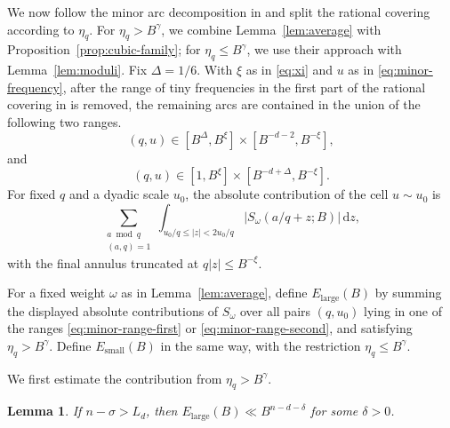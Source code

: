 \documentclass[reqno,a4paper,11pt]{amsart}
\numberwithin{equation}{section}
\newcommand{\dint}{\,\mathrm d}
\theoremstyle{plain}
\newtheorem{lemma}[theorem]{Lemma}
\theoremstyle{definition}
\begin{document}
We now follow the minor arc decomposition in \cite[Section~4]{bp} and split the rational covering according to \(\eta_q\).
For \(\eta_q>B^\gamma\), we combine Lemma~\ref{lem:average} with Proposition~\ref{prop:cubic-family}; for \(\eta_q\leq B^\gamma\), we use their approach with Lemma~\ref{lem:moduli}.
Fix \(\Delta=1/6\).
With \(\xi\) as in \eqref{eq:xi} and \(u\) as in \eqref{eq:minor-frequency}, after the range of tiny frequencies in the first part of the rational covering in \cite[Proof of Lemma~4.2]{bp} is removed, the remaining arcs are contained in the union of the following two ranges.
\begin{equation}\label{eq:minor-range-first}
 (q,u)\in[B^\Delta,B^\xi]\times[B^{-d-2},B^{-\xi}],
\end{equation}
and
\begin{equation}\label{eq:minor-range-second}
 (q,u)\in[1,B^\xi]\times[B^{-d+\Delta},B^{-\xi}].
\end{equation}
For fixed \(q\) and a dyadic scale \(u_0\), the absolute contribution of the cell \(u\sim u_0\) is
\[
 \sum_{\substack{a\bmod q\\(a,q)=1}}
 \int_{u_0/q\leq|z|<2u_0/q}
 |S_\omega(a/q+z;B)|\dint z,
\]
with the final annulus truncated at \(q|z|\leq B^{-\xi}\).

For a fixed weight \(\omega\) as in Lemma~\ref{lem:average}, define \(E_{\mathrm{large}}(B)\) by summing the displayed absolute contributions of \(S_\omega\) over all pairs \((q,u_0)\) lying in one of the ranges \eqref{eq:minor-range-first} or \eqref{eq:minor-range-second}, and satisfying \(\eta_q>B^\gamma\).
Define \(E_{\mathrm{small}}(B)\) in the same way, with the restriction \(\eta_q\leq B^\gamma\).

We first estimate the contribution from \(\eta_q>B^\gamma\).
\begin{lemma}\label{lem:large-height}
If \(n-\sigma>L_d\), then \(E_{\mathrm{large}}(B)\ll B^{n-d-\delta}\) for some \(\delta>0\).
\end{lemma}
\end{document}
